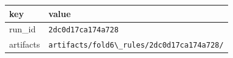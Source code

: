 \begin{tabular}{ll}%
\hline%
\textbf{key}&\textbf{value}\\%
\hline%
run\_id&\texttt{2dc0d17ca174a728}\\%
artifacts&\texttt{artifacts/fold6\textbackslash{}\_rules/2dc0d17ca174a728/}\\%
\hline%
\end{tabular}
